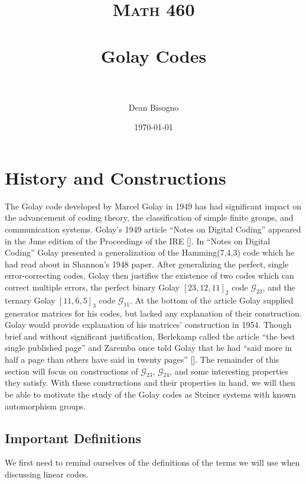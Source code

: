 \documentclass[paper=a4, fontsize=11pt]{scrartcl} %
\title{	
\normalfont \normalsize 
\textsc{Math 460} \\ [25pt] %
\horrule{0.5pt} \\[0.4cm] %
\huge Golay Codes\\ %
\horrule{2pt} \\[0.5cm] %
}
\author{Dean Bisogno} %
\date{\normalsize\today} %
\numberwithin{equation}{section} %
\numberwithin{figure}{section} %
\numberwithin{table}{section} %
\theoremstyle{break}
\begin{document}
\maketitle %

\section{History and Constructions}

The Golay code developed by Marcel Golay in 1949 has had significant impact on the advancement of coding theory, the classification of simple finite groups, and communication systems. Golay's 1949 article ``Notes on Digital Coding'' appeared in the June edition of the Proceedings of the IRE [\cite{golay}]. In ``Notes on Digital Coding'' Golay presented a generalization of the Hamming(7,4,3) code which he had read about in Shannon's 1948 paper. After generalizing the perfect, single error-correcting codes, Golay then justifies the existence of two codes which can correct multiple errors, the perfect binary Golay $[23,12,11]_2$ code $\mathcal{G}_{23}$, and the ternary Golay $[11,6,5]_3$ code $\mathcal{G}_{11}$. At the bottom of the article Golay supplied generator matrices for his codes, but lacked any explanation of their construction. Golay would provide explanation of his matrices' construction in 1954. Though brief and without significant justification, Berlekamp called the article ``the best single published page'' and Zaremba once told Golay that he had ``said more in half a page than others have said in twenty pages'' [\cite{thompson}]. The remainder of this section will focus on constructions of $\mathcal{G}_{23}$, $\mathcal{G}_{24}$, and some interesting properties they satisfy. With these constructions and their properties in hand, we will then be able to motivate the study of the Golay codes as Steiner systems with known automorphism groups.

\subsection{Important Definitions}
We first need to remind ourselves of the definitions of the terms we will use when discussing linear codes.
\end{document}
